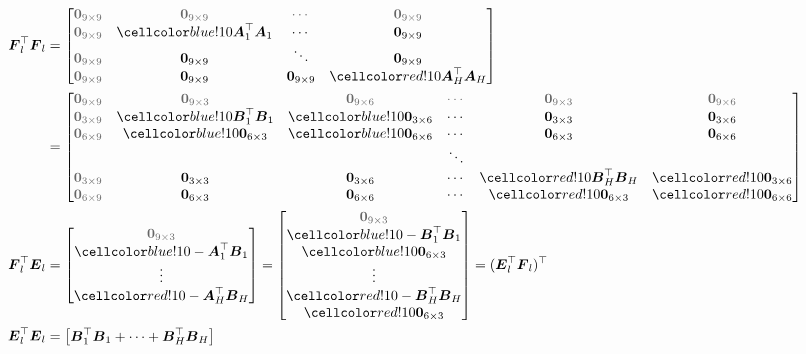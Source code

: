 \begin{align*}
\F_l^\top\F_l &=
\begin{bmatrix}
\g\zero_{9\times9}&\g\zero_{9\times9}&\g\cdots&\g\zero_{9\times9}\\
\g\zero_{9\times9}&\cob\A_1^\top\A_1&\cdots&\zero_{9\times9}\\
\g\zero_{9\times9}&\zero_{9\times9}&\ddots&\zero_{9\times9}\\
\g\zero_{9\times9}&\zero_{9\times9}&\zero_{9\times9}&\cor\A_H^\top\A_H\\
\end{bmatrix}\\
&=
\begin{bmatrix}
\g\zero_{9\times9}&\g\zero_{9\times3}&\g\zero_{9\times6}&\g\cdots&\g\zero_{9\times3}&\g\zero_{9\times6}\\
\g\zero_{3\times9}& \cob\B_1^\top\B_1   &\cob\zero_{3\times6} &\cdots   &\zero_{3\times3}&\zero_{3\times6}\\
\g\zero_{6\times9}& \cob\zero_{6\times3}&\cob\zero_{6\times6} &\cdots&\zero_{6\times3}&\zero_{6\times6}\\
&&&\ddots&&\\
\g\zero_{3\times9}&\zero_{3\times3}&\zero_{3\times6}&\cdots&\cor\B_H^\top\B_H   &\cor\zero_{3\times6}\\
\g\zero_{6\times9}&\zero_{6\times3}&\zero_{6\times6}&\cdots&\cor\zero_{6\times3}&\cor\zero_{6\times6}
\end{bmatrix}\\
\F_l^\top\E_l &= \begin{bmatrix} \g\zero_{9\times3}\\ \cob-\A_1^\top\B_1\\ \vdots\\ \cor-\A_H^\top\B_H\\ \end{bmatrix}
=
\begin{bmatrix} \g\zero_{9\times3}\\ \cob-\B_1^\top\B_1\\ \cob\zero_{6\times3}\\ \vdots\\ \cor-\B_H^\top\B_H\\ \cor\zero_{6\times3} \end{bmatrix}
= (\E_l^\top\F_l)^\top\\
\E_l^\top\E_l &=
\begin{bmatrix}
\B_1^\top\B_1 + \cdots + \B_H^\top\B_H
\end{bmatrix}
\end{align*}

